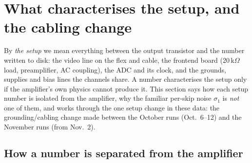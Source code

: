 \documentclass[10pt,a4paper]{article}
\begin{document}
\section{What characterises the setup, and the cabling change}\label{sec:setup2}

By \emph{the setup} we mean everything between the output transistor and the number written to disk: the video line
on the flex and cable, the frontend board (20\,k$\Omega$ load, preamplifier, AC coupling), the ADC and its clock, and
the grounds, supplies and bias lines the channels share. A number characterises the setup only if the amplifier's own
physics cannot produce it. This section says how each setup number is isolated from the amplifier, why the familiar
per-skip noise $\sigma_1$ is \emph{not} one of them, and works through the one setup change in these data: the
grounding/cabling change made between the October runs (Oct.\ 6--12) and the November runs (from Nov.\ 2).

\subsection{How a number is separated from the amplifier}
\end{document}
